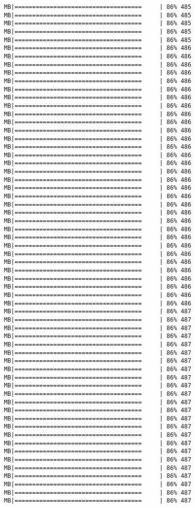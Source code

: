 \documentclass[
]{article}
\begin{document}
\begin{verbatim}
MB|====================================     | 86% 485 MB|====================================     | 86% 485 MB|====================================     | 86% 485 MB|====================================     | 86% 485 MB|====================================     | 86% 485 MB|====================================     | 86% 486 MB|====================================     | 86% 486 MB|====================================     | 86% 486 MB|====================================     | 86% 486 MB|====================================     | 86% 486 MB|====================================     | 86% 486 MB|====================================     | 86% 486 MB|====================================     | 86% 486 MB|====================================     | 86% 486 MB|====================================     | 86% 486 MB|====================================     | 86% 486 MB|====================================     | 86% 486 MB|====================================     | 86% 486 MB|====================================     | 86% 486 MB|====================================     | 86% 486 MB|====================================     | 86% 486 MB|====================================     | 86% 486 MB|====================================     | 86% 486 MB|====================================     | 86% 486 MB|====================================     | 86% 486 MB|====================================     | 86% 486 MB|====================================     | 86% 486 MB|====================================     | 86% 486 MB|====================================     | 86% 486 MB|====================================     | 86% 486 MB|====================================     | 86% 486 MB|====================================     | 86% 486 MB|====================================     | 86% 486 MB|====================================     | 86% 486 MB|====================================     | 86% 486 MB|====================================     | 86% 486 MB|====================================     | 86% 486 MB|====================================     | 86% 487 MB|====================================     | 86% 487 MB|====================================     | 86% 487 MB|====================================     | 86% 487 MB|====================================     | 86% 487 MB|====================================     | 86% 487 MB|====================================     | 86% 487 MB|====================================     | 86% 487 MB|====================================     | 86% 487 MB|====================================     | 86% 487 MB|====================================     | 86% 487 MB|====================================     | 86% 487 MB|====================================     | 86% 487 MB|====================================     | 86% 487 MB|====================================     | 86% 487 MB|====================================     | 86% 487 MB|====================================     | 86% 487 MB|====================================     | 86% 487 MB|====================================     | 86% 487 MB|====================================     | 86% 487 MB|====================================     | 86% 487 MB|====================================     | 86% 487 MB|====================================     | 86% 487 MB|====================================     | 86% 487 
\end{verbatim}
\end{document}
